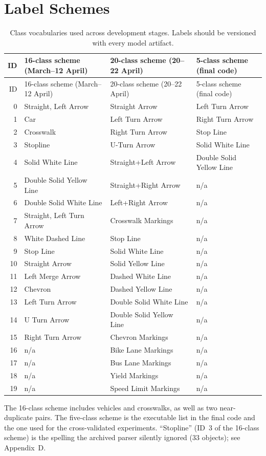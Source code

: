 \documentclass[11pt]{article}
\begin{document}
\clearpage
\appendix

\section{Label Schemes}
\begin{longtable}{r P{0.30\textwidth} P{0.32\textwidth} P{0.22\textwidth}}
\caption{Class vocabularies used across development stages. Labels should be versioned with every model artifact.}\label{tab:labels}\\
\toprule ID & 16-class scheme (March--12 April) & 20-class scheme (20--22 April) & 5-class scheme (final code) \\
\midrule
\endfirsthead
\toprule ID & 16-class scheme (March--12 April) & 20-class scheme (20--22 April) & 5-class scheme (final code) \\
\midrule
{} & Straight, Left Arrow & Straight Arrow & Left Turn Arrow \\
1 & Car & Left Turn Arrow & Right Turn Arrow \\
2 & Crosswalk & Right Turn Arrow & Stop Line \\
3 & Stopline & U-Turn Arrow & Solid White Line \\
4 & Solid White Line & Straight+Left Arrow & Double Solid Yellow Line \\
5 & Double Solid Yellow Line & Straight+Right Arrow & n/a \\
6 & Double Solid White Line & Left+Right Arrow & n/a \\
7 & Straight, Left Turn Arrow & Crosswalk Markings & n/a \\
8 & White Dashed Line & Stop Line & n/a \\
9 & Stop Line & Solid White Line & n/a \\
10 & Straight Arrow & Solid Yellow Line & n/a \\
11 & Left Merge Arrow & Dashed White Line & n/a \\
12 & Chevron & Dashed Yellow Line & n/a \\
13 & Left Turn Arrow & Double Solid White Line & n/a \\
14 & U Turn Arrow & Double Solid Yellow Line & n/a \\
15 & Right Turn Arrow & Chevron Markings & n/a \\
16 & n/a & Bike Lane Markings & n/a \\
17 & n/a & Bus Lane Markings & n/a \\
18 & n/a & Yield Markings & n/a \\
19 & n/a & Speed Limit Markings & n/a \\
\bottomrule
\end{longtable}
\noindent\footnotesize The 16-class scheme includes vehicles and crosswalks, as well as two near-duplicate pairs. The five-class scheme is the executable list in the final code and the one used for the cross-validated experiments. ``Stopline'' (ID~3 of the 16-class scheme) is the spelling the archived parser silently ignored (33 objects); see Appendix~D.
\end{document}
